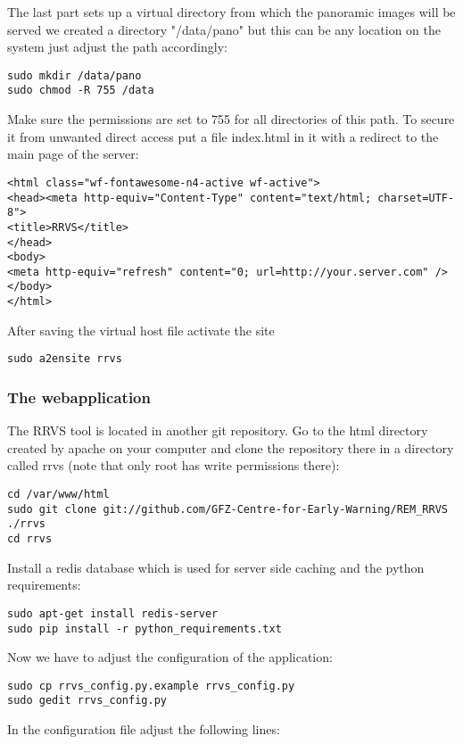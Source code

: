 \documentclass{article}
\begin{document}
The last part sets up a virtual directory from which the panoramic
images will be served we created a directory "/data/pano" but this
can be any location on the system just adjust the path accordingly:
\begin{verbatim}
sudo mkdir /data/pano
sudo chmod -R 755 /data
\end{verbatim}
Make sure the permissions are set to 755 for all directories of 
this path. To secure it from unwanted direct access put a 
file index.html in it with a redirect to the main page of the server:

\begin{verbatim}
<html class="wf-fontawesome-n4-active wf-active">
<head><meta http-equiv="Content-Type" content="text/html; charset=UTF-8"> 
<title>RRVS</title> 
</head>
<body>
<meta http-equiv="refresh" content="0; url=http://your.server.com" />
</body>
</html>
\end{verbatim}

After saving the virtual host file activate the site
\begin{verbatim}
sudo a2ensite rrvs
\end{verbatim}

\subsubsection{The webapplication}

The RRVS tool is located in another git repository. Go to
the html directory created by apache on your computer 
and clone the repository there in a directory called rrvs
(note that only root has write permissions there):
\begin{verbatim}
cd /var/www/html
sudo git clone git://github.com/GFZ-Centre-for-Early-Warning/REM_RRVS ./rrvs
cd rrvs
\end{verbatim}

Install a redis database which is used for server side caching and
the python requirements:
\begin{verbatim}
sudo apt-get install redis-server
sudo pip install -r python_requirements.txt
\end{verbatim}

Now we have to adjust the configuration of the application:
\begin{verbatim}
sudo cp rrvs_config.py.example rrvs_config.py
sudo gedit rrvs_config.py
\end{verbatim}

In the configuration file adjust the following lines:
\end{document}
